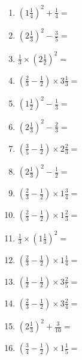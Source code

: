 \documentclass[12pt]{article}
\begin{document}
\begin{enumerate}
\item \large $ \left( 1 \frac{1}{4} \right)^2 + \frac{1}{4} = $ \vspace{1.6cm}
\item \large $ \left( 2 \frac{1}{3} \right)^2 - \frac{3}{5} = $ \vspace{1.6cm}
\item \large $ \frac{1}{3} \times \left( 2 \frac{1}{2} \right)^2 = $ \vspace{1.6cm}
\item \large $ \left( \frac{2}{3} - \frac{1}{2} \right) \times 3 \frac{1}{3} = $ \vspace{1.6cm}
\item \large $ \left( 1 \frac{1}{2} \right)^2 - \frac{1}{3} = $ \vspace{1.6cm}
\newpage
\item \large $ \left( 2 \frac{1}{3} \right)^2 - \frac{2}{3} = $ \vspace{1.6cm}
\item \large $ \left( \frac{3}{5} - \frac{1}{2} \right) \times 2 \frac{2}{3} = $ \vspace{1.6cm}
\item \large $ \left( 2 \frac{1}{3} \right)^2 - \frac{1}{2} = $ \vspace{1.6cm}
\item \large $ \left( \frac{2}{3} - \frac{1}{2} \right) \times 1 \frac{3}{4} = $ \vspace{1.6cm}
\item \large $ \left( \frac{2}{3} - \frac{1}{2} \right) \times 1 \frac{2}{3} = $ \vspace{1.6cm}
\item \large $ \frac{1}{3} \times \left( 1 \frac{1}{3} \right)^2 = $ \vspace{1.6cm}
\item \large $ \left( \frac{2}{3} - \frac{1}{2} \right) \times 1 \frac{1}{4} = $ \vspace{1.6cm}
\item \large $ \left( \frac{1}{2} - \frac{1}{2} \right) \times 3 \frac{2}{5} = $ \vspace{1.6cm}
\item \large $ \left( \frac{2}{3} - \frac{1}{2} \right) \times 3 \frac{2}{4} = $ \vspace{1.6cm}
\item \large $ \left( 2 \frac{1}{3} \right)^2 + \frac{3}{10} = $ \vspace{1.6cm}
\newpage
\item \large $ \left( \frac{3}{4} - \frac{1}{2} \right) \times 1 \frac{1}{5} = $ \vspace{1.6cm}

\end{enumerate}
\end{document}
